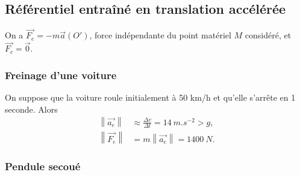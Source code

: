     \subsection[Référentiel entraîné en translation accélérée]{Référentiel entraîné en translation accélérée}

        On a $\vec{F_e}=-m\vec{a}(O')$, force indépendante du point matériel $M$ considéré, et $\vec{F_c}=\vec{0}$.

        \subsubsection{Freinage d'une voiture}

            On suppose que la voiture roule initialement à 50 km/h et qu'elle s'arrête en 1 seconde. Alors
            \begin{equation}
                \begin{aligned}
                    \left\lVert\vec{a_e}\right\rVert&\approx\frac{\Delta v}{\Delta t}=14~m.s^{-2}>g,\\
                    \left\lVert\vec{F_e}\right\rVert&=m\left\lVert \vec{a_e}\right\rVert=1400~N.
                \end{aligned}
            \end{equation}

        \subsubsection{Pendule secoué}

